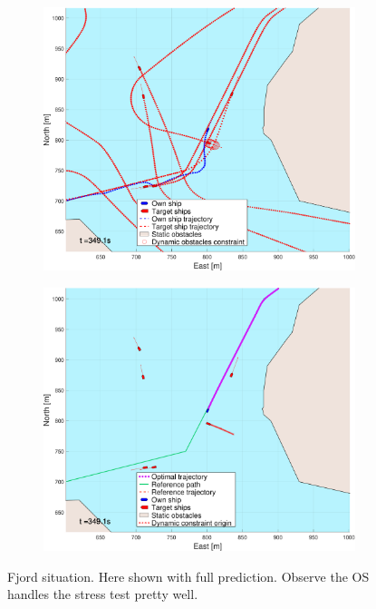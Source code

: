 \begin{figure}[ht!]
\begin{subfigure}[b]{0.494\textwidth}
        \subcaption{}
    \end{subfigure}
    \hfill
    \\ 
    \begin{subfigure}[b]{0.494\textwidth}
        \centering
        \includegraphics[width=\textwidth]{Images/NewFigures/Trheimfjord/_Simple_0fig1_time=350}
        \subcaption{}
    \end{subfigure}
    \hfill
    \begin{subfigure}[b]{0.494\textwidth}
        \centering
        \includegraphics[width=\textwidth]{Images/NewFigures/Trheimfjord/_Simple_0fig999_time=350}
        \subcaption{}
    \end{subfigure}
    \hfill
    \caption{Fjord situation. Here shown with full prediction. Observe the \gls{OS} handles the stress test pretty well.}

\end{figure}


